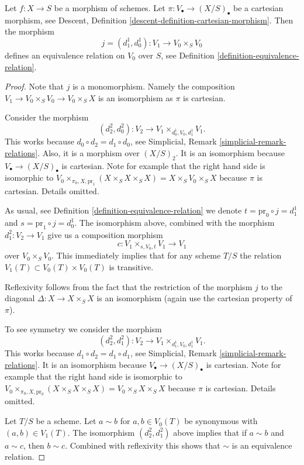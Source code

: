 \begin{lemma}
\label{lemma-equivalence-relation}
Let $f : X \to S$ be a morphism of schemes.
Let $\pi : V_\bullet \to (X/S)_\bullet$ be a cartesian morphism,
see Descent, Definition \ref{descent-definition-cartesian-morphism}.
Then the morphism
$$
j = (d^1_1, d^1_0) : V_1 \to V_0 \times_S V_0
$$
defines an equivalence relation on $V_0$ over $S$,
see Definition \ref{definition-equivalence-relation}.
\end{lemma}

\begin{proof}
Note that $j$ is a monomorphism. Namely the
composition $V_1 \to V_0 \times_S V_0 \to V_0 \times_S X$
is an isomorphism as $\pi$ is cartesian.

\medskip\noindent
Consider the morphism
$$
(d^2_2, d^2_0) : V_2 \to V_1 \times_{d^1_0, V_0, d^1_1} V_1.
$$
This works because $d_0 \circ d_2 = d_1 \circ d_0$,
see Simplicial, Remark \ref{simplicial-remark-relations}.
Also, it is a morphism over $(X/S)_2$. It is an isomorphism
because $V_\bullet \to (X/S)_\bullet$ is cartesian.
Note for example that the
right hand side is isomorphic to
$V_0 \times_{\pi_0, X, \text{pr}_1} (X \times_S X \times_S X) =
X \times_S V_0 \times_S X$
because $\pi$ is cartesian. Details omitted.

\medskip\noindent
As usual, see Definition \ref{definition-equivalence-relation}
we denote $t = \text{pr}_0 \circ j = d^1_1$ and
$s = \text{pr}_1 \circ j = d^1_0$.
The isomorphism above, combined with the morphism
$d^2_1 : V_2 \to V_1$ give us a composition morphism
$$
c : V_1 \times_{s, V_0, t} V_1 \longrightarrow V_1
$$
over $V_0 \times_S V_0$. This immediately implies
that for any scheme $T/S$ the relation
$V_1(T) \subset V_0(T) \times V_0(T)$ is transitive.

\medskip\noindent
Reflexivity follows from the fact that the
restriction of the morphism $j$ to the diagonal
$\Delta : X \to X \times_S X$ is an isomorphism
(again use the cartesian property of $\pi$).

\medskip\noindent
To see symmetry we consider the morphism
$$
(d^2_2, d^2_1) : V_2 \to V_1 \times_{d^1_1, V_0, d^1_1} V_1.
$$
This works because $d_1 \circ d_2 = d_1 \circ d_1$,
see Simplicial, Remark \ref{simplicial-remark-relations}.
It is an isomorphism
because $V_\bullet \to (X/S)_\bullet$ is cartesian.
Note for example that the
right hand side is isomorphic to
$V_0 \times_{\pi_0, X, \text{pr}_0} (X \times_S X \times_S X) =
V_0 \times_S X \times_S X$
because $\pi$ is cartesian. Details omitted.

\medskip\noindent
Let $T/S$ be a scheme. Let $a \sim b$ for $a, b \in V_0(T)$
be synonymous with $(a, b) \in V_1(T)$.
The isomorphism $(d^2_2, d^2_1)$ above
implies that if $a \sim b$ and $a \sim c$, then $b \sim c$.
Combined with reflexivity this shows that $\sim$ is
an equivalence relation.
\end{proof}







